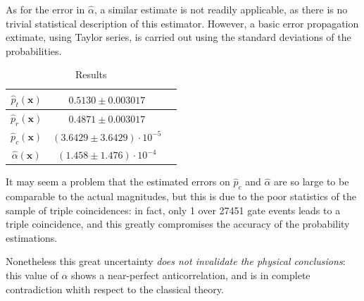 \documentclass[10pt, final]{article}
\begin{document}
\begin{multicols}{2}
As for the error in $\hat{\alpha}$, a similar estimate is not readily applicable, as there is no trivial statistical description of this estimator. However, a basic error propagation extimate, using Taylor series, is carried out using the standard deviations of the probabilities. 
\renewcommand{\arraystretch}{1.5}
\begin{mdframed}
    \begin{table}[H]
        \centering
        \begin{tabular}{|c|c|c|}
            \hline
            $\hat{p}_t (\mathbf{x})$ & $0.5130 \pm 0.003017$\\
            \hline
            $\hat{p}_r (\mathbf{x})$ & $0.4871 \pm 0.003017$\\
            \hline
            $\hat{p}_c (\mathbf{x})$ & $(3.6429 \pm 3.6429) \cdot 10^{-5}$\\
            \hline
            $\hat{\alpha} (\mathbf{x})$ & $(1.458  \pm 1.476) \cdot 10^{-4}$\\
            \hline
        \end{tabular}
        \caption{Results}
        \label{result}
    \end{table}
\end{mdframed}
It may seem a problem that the estimated errors on $\hat{p}_c$ and $\hat{\alpha}$ are so large to be comparable to the actual magnitudes, but this is due to the poor statistics of the sample of triple coincidences: in fact, only 1 over 27451 gate events leads to a triple coincidence, and this greatly compromises the accuracy of the probability estimations. 

Nonetheless this great uncertainty \emph{does not invalidate the physical conclusions}: this value of $\alpha$ shows a near-perfect anticorrelation, and is in complete contradiction whith respect to the classical theory. 



\end{multicols}
\end{document}
